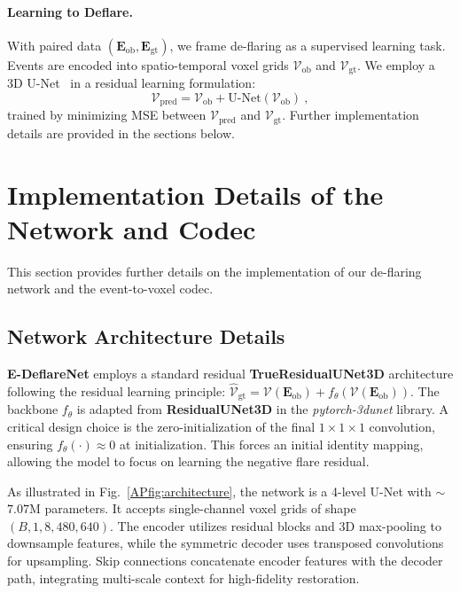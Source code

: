 \paragraph{Learning to Deflare.}
With paired data $(\mathbf{E}_{\mathrm{ob}}, \mathbf{E}_{\mathrm{gt}})$, we frame de-flaring as a supervised learning task. Events are encoded into spatio-temporal voxel grids $\mathcal{V}_{\mathrm{ob}}$ and $\mathcal{V}_{\mathrm{gt}}$. We employ a 3D U-Net~\cite{cciccek20163d} in a residual learning formulation:
%
\begin{equation}
\mathcal{V}_{\mathrm{pred}} = \mathcal{V}_{\mathrm{ob}} + \text{U-Net}(\mathcal{V}_{\mathrm{ob}})~,
\end{equation}
%
trained by minimizing MSE between $\mathcal{V}_{\mathrm{pred}}$ and $\mathcal{V}_{\mathrm{gt}}$. Further implementation details are provided in the sections below.



\section{Implementation Details of the Network and Codec}
\label{app:network_details}

This section provides further details on the implementation of our de-flaring network and the event-to-voxel codec.

\subsection{Network Architecture Details}
\textbf{E-DeflareNet} employs a standard residual \textbf{TrueResidualUNet3D} architecture following the residual learning principle: $\hat{\mathcal{V}}_{\mathrm{gt}} = \mathcal{V}(\mathbf{E}_{\mathrm{ob}}) + f_{\theta}(\mathcal{V}(\mathbf{E}_{\mathrm{ob}}))$. The backbone $f_{\theta}$ is adapted from \textbf{ResidualUNet3D} in the \textit{pytorch-3dunet} library. A critical design choice is the zero-initialization of the final $1\times1\times1$ convolution, ensuring $f_{\theta}(\cdot) \approx 0$ at initialization. This forces an initial identity mapping, allowing the model to focus on learning the negative flare residual.

As illustrated in Fig.~\ref{APfig:architecture}, the network is a 4-level U-Net with $\sim$$7.07$M parameters. It accepts single-channel voxel grids of shape $(B, 1, 8, 480, 640)$. The encoder utilizes residual blocks and 3D max-pooling to downsample features, while the symmetric decoder uses transposed convolutions for upsampling. Skip connections concatenate encoder features with the decoder path, integrating multi-scale context for high-fidelity restoration.

